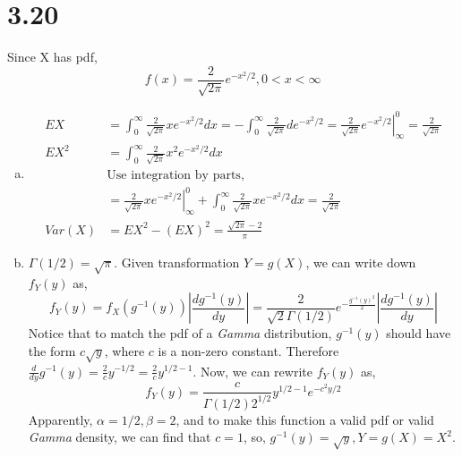 \documentclass[letterpaper]{article}
\newcommand{\sqtpi}{\sqrt{2\pi}}
\newcommand{\intzi}{\int_0^\infty}
\begin{document}
    \section*{3.20}
    Since X has pdf,
    \[
    f(x) = \frac{2}{\sqtpi} e^{-x^2/2}, 0 < x < \infty
    \]
    \begin{enumerate}[(a)]
        \item 
        \begin{align*}
        EX & = \intzi \frac{2}{\sqtpi} x e^{-x^2/2} dx = -\intzi \frac{2}{\sqtpi} d e^{-x^2/2}
        = \left. \frac{2}{\sqtpi} e^{-x^2/2} \right|^0_\infty = \frac{2}{\sqtpi} \\
        EX^2 & = \intzi \frac{2}{\sqtpi} x^2 e^{-x^2/2} dx \\
        & \text{Use integration by parts}, \\
        & = \left. \frac{2}{\sqtpi} x e^{-x^2/2} \right|_\infty^0 + \intzi \frac{2}{\sqtpi} x e^{-x^2/2} dx = \frac{2}{\sqtpi}\\
        Var(X) & = EX^2 - (EX)^2 = \frac{\sqtpi -2}{\pi}
        \end{align*}
        \item $\Gamma(1/2) = \sqrt{\pi}$. Given transformation $Y = g(X)$, we can write down $f_Y(y)$ as,
        \[
        f_Y(y)  = f_X(g^{-1}(y)) \left| \frac{d g^{-1}(y)}{dy} \right|
        = \frac{2}{\sqrt{2} \Gamma(1/2)} e^{-\frac{g^{-1}(y)^2}{2}} \left| \frac{d g^{-1}(y)}{dy} \right|
        \]
        Notice that to match the pdf of a \emph{Gamma} distribution, $g^{-1}(y)$ should have the form $c\sqrt{y}$, where $c$ is a non-zero constant. Therefore 
        $\frac{d}{dy} g^{-1}(y) = \frac{2}{c} y^{-1/2} = \frac{2}{c} y^{1/2-1}$.
        Now, we can rewrite $f_Y(y)$ as,
        \[
        f_Y(y) = \frac{c}{\Gamma(1/2) 2^{1/2}} y^{1/2-1} e^{-c^2y/2}
        \]
        Apparently, $\alpha = 1/2, \beta = 2$, and to make this function a valid pdf or valid \emph{Gamma} density, we can find that $c=1$, so, $g^{-1}(y) = \sqrt{y}, Y=g(X)=X^2$.
    \end{enumerate}
\end{document}
